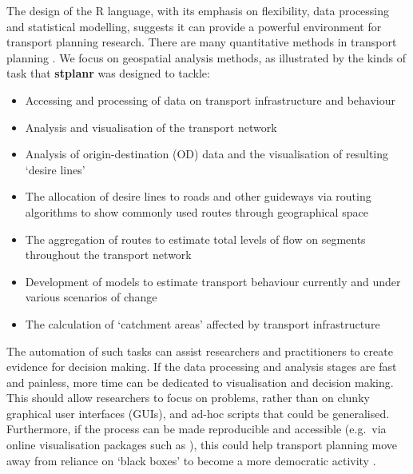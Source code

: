 The design of the R language, with its emphasis on flexibility, data
processing and statistical modelling, suggests it can provide a powerful
environment for transport planning research. There are many quantitative
methods in transport planning \citep{willumsen_modelling_2011}.
We focus on geospatial analysis methods, as illustrated by the kinds of task that \textbf{stplanr} was designed to tackle:

\begin{itemize}
\tightlist
\item
  Accessing and processing of data on transport infrastructure and
  behaviour
\item
  Analysis and visualisation of the transport network
\item
  Analysis of origin-destination (OD) data and the visualisation of
  resulting `desire lines'
\item
  The allocation of desire lines to roads and other guideways via
  routing algorithms to show commonly used routes through geographical
  space
\item
  The aggregation of routes to estimate total levels of flow on segments
  throughout the transport network
\item
  Development of models to estimate transport behaviour currently and
  under various scenarios of change
\item
  The calculation of `catchment areas' affected by transport
  infrastructure
\end{itemize}

The automation of such tasks can assist researchers and practitioners to
create evidence for decision making. If the data processing and analysis
stages are fast and painless, more time can be dedicated to
visualisation and decision making. This should allow researchers to
focus on problems, rather than on
clunky graphical user interfaces (GUIs), and ad-hoc scripts that could
be generalised. Furthermore, if the process can be made reproducible and
accessible (e.g.~via online visualisation packages such as
), this could help transport
planning move away from reliance on `black boxes' to become a more
democratic activity
\citep{waddell_urbansim:_2002,hollander_who_2015}.

